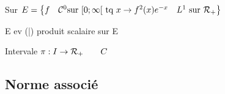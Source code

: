 \documentclass[a3paper,french,bookmarks]{article}
\begin{document}
    
    \vspace{2cm}
    
    
    Sur $E = \left\{f \quad \mathcal{C}^0 \text{sur [}0;\infty[ \text{ tq }x \to f^2(x)e^{-x}\quad L^1 \text{ sur } \mathcal{R}_+ \right\}$
    
    \begin{enumerate}
        \itast E ev 
        \itast (|)  produit scalaire sur E 
    \end{enumerate}
    
    \textasteriskcentered Intervale $\pi:I \to \mathcal{R}_+ \qquad C$ 
    
    \subsection{Norme associé}
    
    
    
    
    
\end{document}
